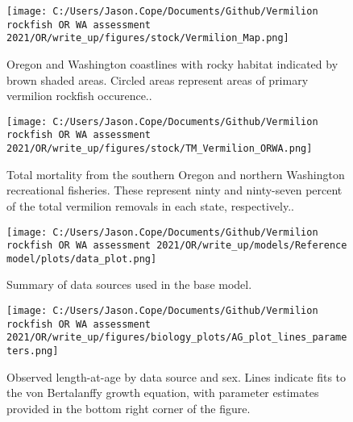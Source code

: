 \documentclass[11pt,
  english,
  a4paper,
]{article}
\begin{document}
\begin{figure}
\centering
\texttt{[image: C:/Users/Jason.Cope/Documents/Github/Vermilion rockfish OR WA assessment 2021/OR/write\_up/figures/stock/Vermilion\_Map.png]}
\caption{Oregon and Washington coastlines with rocky habitat indicated by brown shaded areas. Circled areas represent areas of primary vermilion rockfish occurence..\label{fig:ORWA-map}}
\end{figure}

\tagmcend\tagstructend


\begin{figure}
\centering
\texttt{[image: C:/Users/Jason.Cope/Documents/Github/Vermilion rockfish OR WA assessment 2021/OR/write\_up/figures/stock/TM\_Vermilion\_ORWA.png]}
\caption{Total mortality from the southern Oregon and northern Washington recreational fisheries. These represent ninty and ninty-seven percent of the total vermilion removals in each state, respectively..\label{fig:tm-plot}}
\end{figure}

\tagmcend\tagstructend


\begin{figure}
\centering
\texttt{[image: C:/Users/Jason.Cope/Documents/Github/Vermilion rockfish OR WA assessment 2021/OR/write\_up/models/Reference model/plots/data\_plot.png]}
\caption{Summary of data sources used in the base model.\label{fig:data-plot}}
\end{figure}

\tagmcend\tagstructend


\begin{figure}
\centering
\texttt{[image: C:/Users/Jason.Cope/Documents/Github/Vermilion rockfish OR WA assessment 2021/OR/write\_up/figures/biology\_plots/AG\_plot\_lines\_parameters.png]}
\caption{Observed length-at-age by data source and sex. Lines indicate fits to the von Bertalanffy growth equation, with parameter estimates provided in the bottom right corner of the figure.\label{fig:len-age-data}}
\end{figure}
\end{document}
